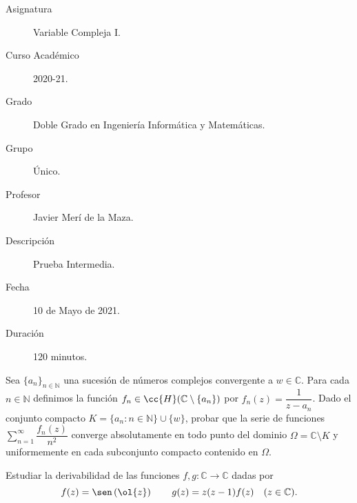 \documentclass[12pt]{article}
\begin{document}

    
    

    \begin{description}
        \item[Asignatura] Variable Compleja I.
        \item[Curso Académico] 2020-21.
        \item[Grado] Doble Grado en Ingeniería Informática y Matemáticas.
        \item[Grupo] Único.
        \item[Profesor] Javier Merí de la Maza.
        \item[Descripción] Prueba Intermedia.
        \item[Fecha] 10 de Mayo de 2021.
        \item[Duración] 120 minutos.
    
    \end{description}
    \newpage

    \begin{ejercicio}[3 puntos]
        Sea $\{a_n\}_{n \in \mathbb{N}}$ una sucesión de números complejos convergente a $w \in \mathbb{C}$. Para cada $n \in \mathbb{N}$ definimos la función $f_n \in \cc{H}(\mathbb{C} \setminus \{a_n\})$ por $f_n(z) = \dfrac{1}{z - a_n}$. Dado el conjunto compacto $K = \{a_n : n \in \mathbb{N}\} \cup \{w\}$, probar que la serie de funciones $\displaystyle \sum_{n=1}^{\infty} \dfrac{f_n(z)}{n^2}$ converge absolutamente en todo punto del dominio $\Omega = \mathbb{C} \setminus K$ y uniformemente en cada subconjunto compacto contenido en $\Omega$.
    \end{ejercicio}

    \begin{ejercicio}[3 puntos]
        Estudiar la derivabilidad de las funciones $f, g : \mathbb{C} \to \mathbb{C}$ dadas por
        \[
            f(z) = \sen\left(\ol{z}\right)\qquad g(z) = z(z-1)f(z) \quad (z \in \mathbb{C}).
        \]
    \end{ejercicio}
\end{document}
